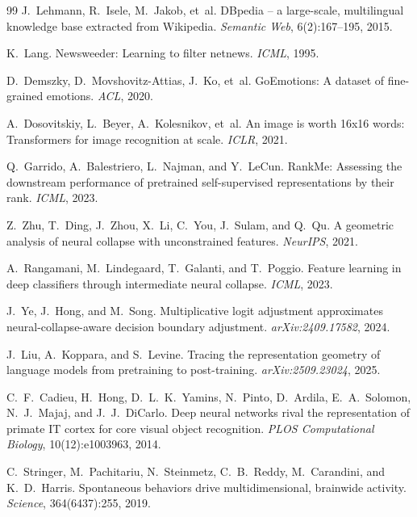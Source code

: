 \documentclass{article}
\begin{document}
\begin{thebibliography}{99}
J.~Lehmann, R.~Isele, M.~Jakob, et~al.
\newblock DBpedia -- a large-scale, multilingual knowledge base extracted from Wikipedia.
\newblock \emph{Semantic Web}, 6(2):167--195, 2015.

K.~Lang.
\newblock Newsweeder: Learning to filter netnews.
\newblock \emph{ICML}, 1995.

D.~Demszky, D.~Movshovitz-Attias, J.~Ko, et~al.
\newblock GoEmotions: A dataset of fine-grained emotions.
\newblock \emph{ACL}, 2020.

A.~Dosovitskiy, L.~Beyer, A.~Kolesnikov, et~al.
\newblock An image is worth 16x16 words: Transformers for image recognition at scale.
\newblock \emph{ICLR}, 2021.

Q.~Garrido, A.~Balestriero, L.~Najman, and Y.~LeCun.
\newblock RankMe: Assessing the downstream performance of pretrained self-supervised representations by their rank.
\newblock \emph{ICML}, 2023.

Z.~Zhu, T.~Ding, J.~Zhou, X.~Li, C.~You, J.~Sulam, and Q.~Qu.
\newblock A geometric analysis of neural collapse with unconstrained features.
\newblock \emph{NeurIPS}, 2021.

A.~Rangamani, M.~Lindegaard, T.~Galanti, and T.~Poggio.
\newblock Feature learning in deep classifiers through intermediate neural collapse.
\newblock \emph{ICML}, 2023.

J.~Ye, J.~Hong, and M.~Song.
\newblock Multiplicative logit adjustment approximates neural-collapse-aware decision boundary adjustment.
\newblock \emph{arXiv:2409.17582}, 2024.

J.~Liu, A.~Koppara, and S.~Levine.
\newblock Tracing the representation geometry of language models from pretraining to post-training.
\newblock \emph{arXiv:2509.23024}, 2025.

C.~F.~Cadieu, H.~Hong, D.~L.~K.~Yamins, N.~Pinto, D.~Ardila, E.~A.~Solomon, N.~J.~Majaj, and J.~J.~DiCarlo.
\newblock Deep neural networks rival the representation of primate {IT} cortex for core visual object recognition.
\newblock \emph{PLOS Computational Biology}, 10(12):e1003963, 2014.

C.~Stringer, M.~Pachitariu, N.~Steinmetz, C.~B.~Reddy, M.~Carandini, and K.~D.~Harris.
\newblock Spontaneous behaviors drive multidimensional, brainwide activity.
\newblock \emph{Science}, 364(6437):255, 2019.


\end{thebibliography}
\end{document}
